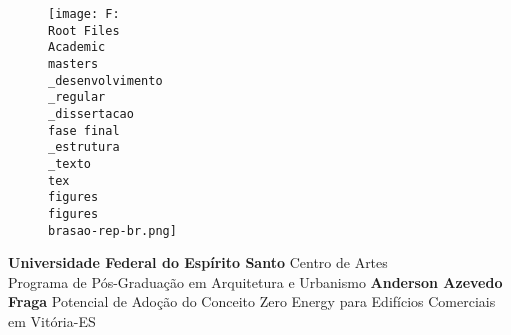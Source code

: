 \documentclass[a4paper, 12pt]{article}
\begin{document}
\begin{titlepage}
    \begin{center}
        \begin{figure}
            \centering
            \texttt{[image: F:\\Root Files\\Academic\\masters\\\_desenvolvimento\\\_regular\\\_dissertacao\\fase final\\\_estrutura\\\_texto\\tex\\figures\\figures\\brasao-rep-br.png]}
        \end{figure}
        \vspace*{3cm}
        \textbf{Universidade Federal do Espírito Santo}
        \vspace*{0.5cm}
        Centro de Artes\\
        Programa de Pós-Graduação em Arquitetura e Urbanismo
        \vspace*{1.5cm}
        \textbf{Anderson Azevedo Fraga}
        \vfill
        Potencial de Adoção do Conceito Zero Energy para Edifícios Comerciais em Vitória-ES
        \vspace*{0.8cm}

    \end{center}
\end{titlepage}


\maketitle
\thispagestyle{empty} %
\pagebreak



\listoffigures\pagebreak
\listoftables\pagebreak
\tableofcontents\pagebreak









%
\printbibliography
\end{document}
